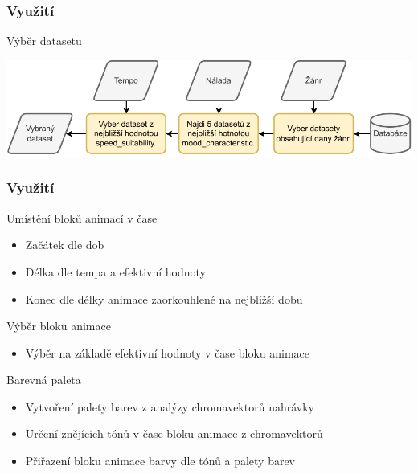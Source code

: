 \documentclass[%
  12pt,       				%
	t,                  %
	aspectratio=1610,   %
	unicode,						%
]{beamer}				    	%
\begin{document}
\begin{frame}
	\frametitle{Využití}
	\begin{block}{Výběr datasetu}
	\end{block}
	\vspace{1cm}

	\includegraphics[width = 1\columnwidth]{obrazky/Dataset_selection_diagram.pdf}

\end{frame}

\begin{frame}
	\frametitle{Využití}
	\begin{block}{Umístění bloků animací v čase}
		\begin{itemize}
			\item Začátek dle dob
			\item Délka dle tempa a efektivní hodnoty
			\item Konec dle délky animace zaorkouhlené na nejbližší dobu
		\end{itemize}
	\end{block}
	\begin{block}{Výběr bloku animace}
		\begin{itemize}
			\item Výběr na základě efektivní hodnoty v čase bloku animace
		\end{itemize}
	\end{block}

	\begin{block}{Barevná paleta}
		\begin{itemize}
			\item Vytvoření palety barev z analýzy chromavektorů nahrávky
			\item Určení znějících tónů v čase bloku animace z chromavektorů
			\item Přiřazení bloku animace barvy dle tónů a palety barev
		\end{itemize}
	\end{block}
\end{frame}

\end{document}
